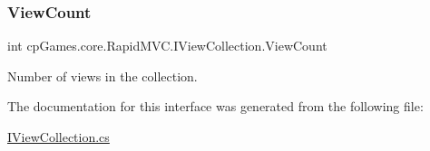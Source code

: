 \subsubsection{\texorpdfstring{ViewCount}{ViewCount}}
{\footnotesize\ttfamily int cp\+Games.\+core.\+Rapid\+M\+V\+C.\+I\+View\+Collection.\+View\+Count\hspace{0.3cm}{\ttfamily [get]}}



Number of views in the collection. 



The documentation for this interface was generated from the following file\+:\begin{DoxyCompactItemize}
\item 
\mbox{\hyperlink{_i_view_collection_8cs}{I\+View\+Collection.\+cs}}\end{DoxyCompactItemize}
